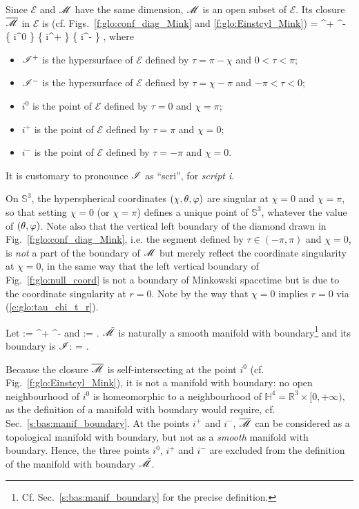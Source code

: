 Since $\mathscr{E}$ and $\mathscr{M}$ have the same dimension, $\mathscr{M}$ is an open subset of $\mathscr{E}$.
Its closure $\overline{\mathscr{M}}$ in $\mathscr{E}$ is (cf.
Figs.~\ref{f:glo:conf_diag_Mink} and \ref{f:glo:Einstcyl_Mink})
\be
    \overline{\M} = \M \cup \scri^+ \cup \scri^- \cup \left\{ i^0 \right\} \cup
            \left\{ i^+ \right\} \cup \left\{ i^- \right\} ,
\ee
where
\begin{itemize}
\item $\mathscr{I}^+$ is the hypersurface of $\mathscr{E}$ defined by
$\tau = \pi - \chi$ and $0 < \tau < \pi$;
\item $\mathscr{I}^-$ is the hypersurface of $\mathscr{E}$ defined by
$\tau = \chi - \pi $ and $-\pi  < \tau < 0$;
\item $i^0$ is the point of $\mathscr{E}$ defined by $\tau=0$ and $\chi=\pi$;
\item $i^+$ is the point of $\mathscr{E}$ defined by $\tau=\pi$ and $\chi=0$;
\item $i^-$ is the point of $\mathscr{E}$ defined by $\tau=-\pi$ and $\chi=0$.
\end{itemize}
It is customary to pronounce $\mathscr{I}$ as ``scri'', for \emph{script i}.

\begin{remark}
On $\mathbb{S}^3$, the hyperspherical coordinates $(\chi,\theta,\varphi)$
are singular at $\chi=0$ and $\chi=\pi$, so that setting $\chi=0$ (or $\chi=\pi$)
defines a unique point of $\mathbb{S}^3$, whatever the value of $(\theta,\varphi)$.
Note also that the vertical left boundary of the diamond drawn in
Fig.~\ref{f:glo:conf_diag_Mink}, i.e. the segment defined by
$\tau\in(-\pi,\pi)$ and $\chi=0$, is \emph{not} a part of the boundary
of $\mathscr{M}$ but merely reflect the coordinate singularity at $\chi=0$, in the same
way that the left vertical boundary of Fig.~\ref{f:glo:null_coord}
is not a boundary of Minkowski spacetime but is
due to the coordinate singularity at $r=0$. Note by the way that
$\chi=0$ implies $r=0$ via (\ref{e:glo:tau_chi_t_r}).
\end{remark}

Let
\be
    \scri := \scri^+ \cup \scri^-
\ee
and
\be \label{e:glo:def_tM_Mink}
    \tilde{\M} := \M \cup \scri .
\ee
$\tilde{\mathscr{M}}$ is naturally a smooth manifold with
boundary\footnote{Cf. Sec.~\ref{s:bas:manif_boundary} for the precise definition.}
and its boundary is $\mathscr{I}$:
\be
    \partial \tilde{\M} = \scri.
\ee
\begin{remark}
Because the closure $\overline{\mathscr{M}}$ is self-intersecting at the point $i^0$
(cf. Fig.~\ref{f:glo:Einstcyl_Mink}), it is not a manifold with boundary: no open neighbourhood of
$i^0$ is homeomorphic to a neighbourhood of
$\mathbb{H}^4 = \mathbb{R}^3\times {[0,+\infty)}$,
as the definition of a manifold with boundary would
require, cf. Sec.~\ref{s:bas:manif_boundary}.
At the points $i^+$ and $i^-$, $\overline{\mathscr{M}}$ can be considered as a
topological manifold with boundary, but not as a \emph{smooth} manifold with boundary.
Hence, the three points $i^0$, $i^+$ and $i^-$ are excluded from the definition
of the manifold with boundary $\tilde{\mathscr{M}}$.
\end{remark}


